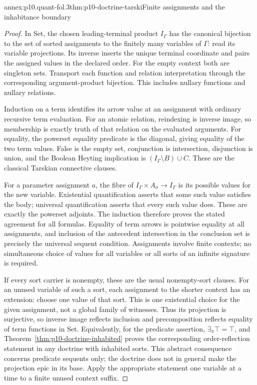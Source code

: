 \begin{annexitem}{annex:p10.quant-fol.3}{thm:p10-doctrine-tarski}{Finite assignments and the inhabitance boundary}
\begin{proof}
In Set, the chosen leading-terminal product \(I_\Gamma\) has the
canonical bijection to the set of sorted assignments to the finitely
many variables of \(\Gamma\): read its variable projections.
Its inverse inserts the unique terminal coordinate and pairs the
assigned values in the declared order.
For the empty context both are singleton sets.
Transport each function and relation interpretation through the
corresponding argument-product bijection. This includes nullary
functions and nullary relations.

Induction on a term identifies its arrow value at an assignment with
ordinary recursive term evaluation. For an atomic relation, reindexing
is inverse image, so membership is exactly truth of that relation on
the evaluated arguments. For equality, the powerset equality predicate
is the diagonal, giving equality of the two term values.
False is the empty set, conjunction is intersection, disjunction is
union, and the Boolean Heyting implication is
\((I_\Gamma\setminus B)\cup C\). These are the classical Tarskian
connective clauses.

For a parameter assignment \(a\), the fibre of
\(I_\Gamma\times A_\sigma\to I_\Gamma\) is its possible values
for the new variable. Existential quantification asserts that some
such value satisfies the body; universal quantification asserts that
every such value does. These are exactly the powerset adjoints.
The induction therefore proves the stated agreement for all formulas.
Equality of term arrows is pointwise equality at all assignments,
and inclusion of the antecedent intersection in the conclusion set
is precisely the universal sequent condition.
Assignments involve finite contexts; no simultaneous choice of values
for all variables or all sorts of an infinite signature is required.

If every sort carrier is nonempty, these are the usual nonempty-sort
clauses. For an unused variable of such a sort, each assignment to
the shorter context has an extension: choose one value of that sort.
This is one existential choice for the given assignment, not a global
family of witnesses. Thus its projection is surjective, so inverse
image reflects inclusion and precomposition reflects equality of term
functions in Set. Equivalently, for the predicate assertion,
\(\exists_\pi\top=\top\), and
Theorem~\ref{thm:p10-doctrine-inhabited} proves the corresponding
order-reflection statement in any doctrine with inhabited sorts.
This abstract consequence concerns predicate sequents only; the
doctrine does not in general make the projection epic in its base.
Apply the appropriate statement one variable at a time to a finite
unused context suffix.


\end{proof}
\end{annexitem}
